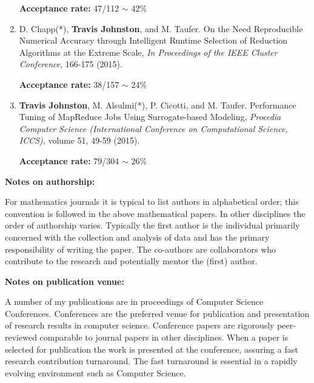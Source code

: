 \documentclass{article}
\begin{document}
\begin{enumerate}[1.]
		\textbf{Acceptance rate:} 47/112 $\sim$ 42\%

		
		\item D. Chapp(*), \textbf{Travis Johnston}, and M. Taufer. On the Need Reproducible Numerical Accuracy through Intelligent Runtime Selection of Reduction Algorithms at the Extreme Scale,
		\textit{In Proceedings of the IEEE Cluster Conference}, 166-175 (2015).

		\textbf{Acceptance rate: } 38/157 $\sim$ 24\%


		\item \textbf{Travis Johnston}, M. Alsulmi(*), P. Cicotti, and M. Taufer. Performance Tuning of MapReduce Jobs Using Surrogate-based Modeling, 
		\textit{Procedia Computer Science (International Conference on Computational Science, ICCS)}, volume 51, 49-59 (2015).

		\textbf{Acceptance rate: } 79/304 $\sim$ 26\%

	\end{enumerate}

\medskip

\noindent \textbf{Notes on authorship: }

\noindent For mathematics journals it is typical to list authors in alphabetical order; this convention is followed in the above mathematical papers.
In other disciplines the order of authorship varies.  
Typically the first author is the individual primarily concerned with the collection and analysis of data and has the primary responsibility of writing the paper.
The co-authors are collaborators who contribute to the research and potentially mentor the (first) author.

\medskip

\noindent \textbf{Notes on publication venue: }

\noindent A number of my publications are in proceedings of Computer Science Conferences.
Conferences are the preferred venue for publication and presentation of research results in computer science.
Conference papers are rigorously peer-reviewed comparable to journal papers in other disciplines.
When a paper is selected for publication the work is presented at the conference, assuring a fast research contribution turnaround.
The fast turnaround is essential in a rapidly evolving environment such as Computer Science.

\vspace{.25 in}
\end{document}

